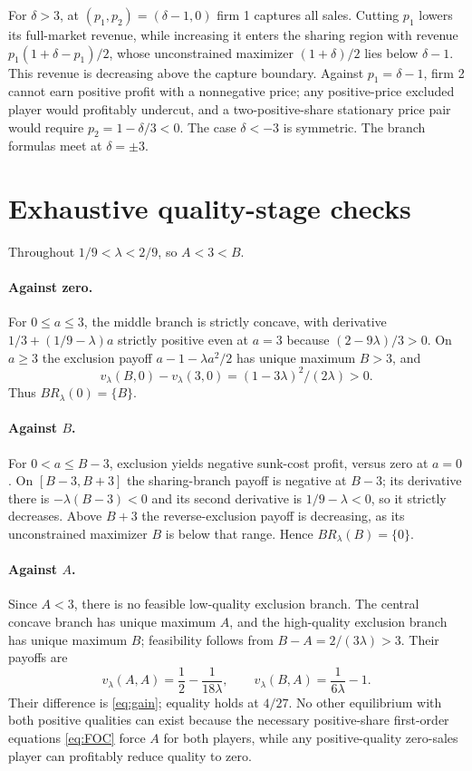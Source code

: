 \documentclass[11pt]{article}
\begin{document}
For $\delta>3$, at $(p_1,p_2)=(\delta-1,0)$ firm 1 captures all sales. Cutting $p_1$ lowers its full-market revenue, while increasing it enters the sharing region with revenue $p_1(1+\delta-p_1)/2$, whose unconstrained maximizer $(1+\delta)/2$ lies below $\delta-1$. This revenue is decreasing above the capture boundary. Against $p_1=\delta-1$, firm 2 cannot earn positive profit with a nonnegative price; any positive-price excluded player would profitably undercut, and a two-positive-share stationary price pair would require $p_2=1-\delta/3<0$. The case $\delta<-3$ is symmetric. The branch formulas meet at $\delta=\pm3$.

\section{Exhaustive quality-stage checks}\label{app:quality}
Throughout $1/9<\lambda<2/9$, so $A<3<B$.
\paragraph{Against zero.} For $0\le a\le3$, the middle branch is strictly concave, with derivative $1/3+(1/9-\lambda)a$ strictly positive even at $a=3$ because $(2-9\lambda)/3>0$. On $a\ge3$ the exclusion payoff $a-1-\lambda a^2/2$ has unique maximum $B>3$, and
\[
v_\lambda(B,0)-v_\lambda(3,0)=(1-3\lambda)^2/(2\lambda)>0.
\]
Thus $BR_\lambda(0)=\{B\}$.
\paragraph{Against $B$.} For $0<a\le B-3$, exclusion yields negative sunk-cost profit, versus zero at $a=0$. On $[B-3,B+3]$ the sharing-branch payoff is negative at $B-3$; its derivative there is $-\lambda(B-3)<0$ and its second derivative is $1/9-\lambda<0$, so it strictly decreases. Above $B+3$ the reverse-exclusion payoff is decreasing, as its unconstrained maximizer $B$ is below that range. Hence $BR_\lambda(B)=\{0\}$.
\paragraph{Against $A$.} Since $A<3$, there is no feasible low-quality exclusion branch. The central concave branch has unique maximum $A$, and the high-quality exclusion branch has unique maximum $B$; feasibility follows from $B-A=2/(3\lambda)>3$. Their payoffs are
\[
v_\lambda(A,A)=\frac12-\frac1{18\lambda},\qquad
v_\lambda(B,A)=\frac1{6\lambda}-1.
\]
Their difference is \eqref{eq:gain}; equality holds at $4/27$. No other equilibrium with both positive qualities can exist because the necessary positive-share first-order equations \eqref{eq:FOC} force $A$ for both players, while any positive-quality zero-sales player can profitably reduce quality to zero.
\end{document}
